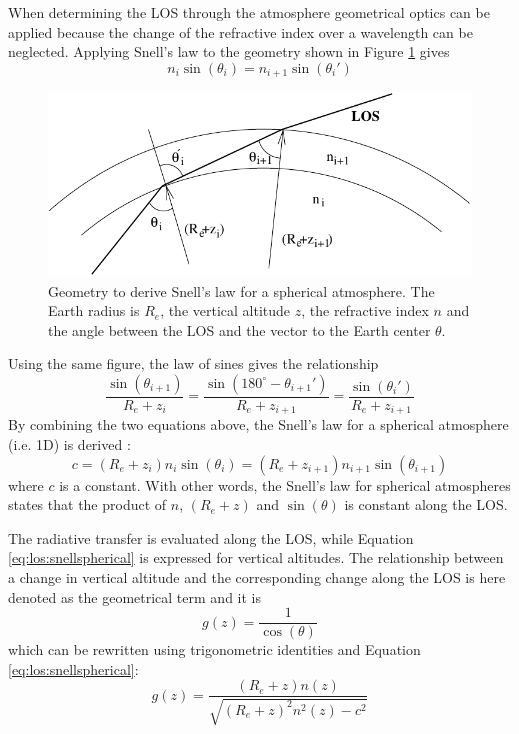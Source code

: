    When determining the LOS through the atmosphere geometrical optics 
   can be applied because the change of the refractive index over a
   wavelength can be neglected. Applying Snell's law to the geometry 
   shown in Figure \ref{fig:los:snell} gives
   \begin{equation}
     n_i \sin (\theta_i) = n_{i+1} \sin (\theta_i')
   \end{equation}
   \begin{figure}
    \begin{center}
      \includegraphics*{Figs/snell}
      \caption{Geometry to derive Snell's law for a spherical atmosphere. 
               The Earth radius is $R_e$, the vertical
               altitude $z$, the refractive index $n$ and the angle
               between the LOS and the vector to the Earth center $\theta$.}
      \label{fig:los:snell} 
    \end{center} 
  \end{figure}
  Using the same figure, the law of sines gives the relationship
  \begin{equation}
    \frac{\sin(\theta_{i+1})}{R_e+z_i} = 
    \frac{\sin(180^\circ-\theta_{i+1}')}{R_e+z_{i+1}} =
    \frac{\sin(\theta_i')}{R_e+z_{i+1}} 
  \end{equation}
  By combining the two equations above, the Snell's law for a spherical
  atmosphere (i.e. 1D) is derived \citep[e.g.][]{kyle:91,balluch:97}:
  \begin{equation}
    c = (R_e+z_i) n_i \sin(\theta_i) = (R_e+z_{i+1}) n_{i+1}\sin(\theta_{i+1}) 
   \label{eq:los:snellspherical}
  \end{equation}
  where $c$ is a constant. With other words, the Snell's law for spherical
  atmospheres states that the product of $n$, $(R_e+z)$ and $\sin(\theta)$ is
  constant along the LOS.

  The radiative transfer is evaluated along the LOS, while Equation 
  \ref{eq:los:snellspherical} is expressed for vertical altitudes.
  The relationship between a change in vertical altitude and the
  corresponding change along the LOS is here denoted as the geometrical term
  and it is
  \begin{equation}
    g(z) = \frac{1}{\cos(\theta)}
  \end{equation}
  which can be rewritten using trigonometric identities and Equation
  \ref{eq:los:snellspherical}:
  \begin{equation}
    g(z) = \frac {(R_e+z)n(z)} {\sqrt{ (R_e+z)^2n^2(z) - c^2 }}
   \label{eq:los:gterm}
  \end{equation}


